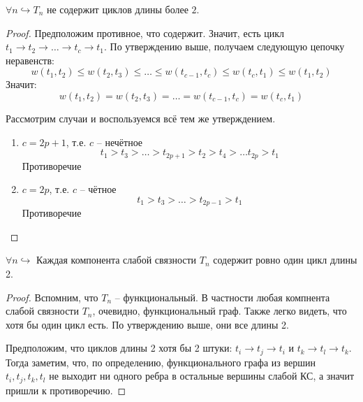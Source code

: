 \St $\forall n \hookrightarrow \text{$T_n$ не содержит циклов длины более 2}$.
\begin{proof}
    
    Предположим противное, что содержит. Значит, есть цикл $t_1 \to t_2 \to \dots \to t_c \to t_1$. По утверждению выше, получаем следующую цепочку неравенств:
    \begin{equation*}
        w(t_1, t_2) \leq w(t_2, t_3) \leq \dots \leq w(t_{c - 1}, t_c) \leq w(t_c, t_1) \leq w(t_1, t_2)
    \end{equation*}
    Значит:
    \begin{equation*}
        w(t_1, t_2) = w(t_2, t_3) = \dots = w(t_{c - 1}, t_c) = w(t_c, t_1)
    \end{equation*} 
    
    Рассмотрим случаи и воспользуемся всё тем же утверждением.

    \begin{enumerate}
        \item $c = 2p + 1$, т.е. $c$ -- нечётное
            \begin{equation*}
                t_1 > t_3 > \dots > t_{2p + 1} > t_2 > t_4 > \dots t_{2p} > t_1
            \end{equation*}
            Противоречие
        \item $c = 2p$, т.е. $c$ -- чётное
            \begin{equation*}
                t_1 > t_3 > \dots > t_{2p - 1} > t_1
            \end{equation*}
            Противоречие
    \end{enumerate}

\end{proof}

\Cons $\forall n \hookrightarrow$ Каждая компонента слабой связности $T_n$ содержит ровно один цикл длины 2.
\begin{proof}
    
    Вспомним, что $T_n$ -- функциональный. В частности любая компнента слабой связности $T_n$, очевидно, функциональный граф. Также легко видеть, что хотя бы один цикл есть. По утверждению выше, они все длины 2.

    Предположим, что циклов длины 2 хотя бы 2 штуки: $t_i \to t_j \to t_i$ и $t_k \to t_l \to t_k$. Тогда заметим, что, по определению, функционального графа из вершин $t_i, t_j, t_k, t_l$ не выходит ни одного ребра в остальные вершины слабой КС, а значит пришли к противоречию.

\end{proof}

